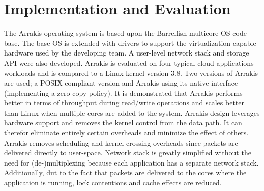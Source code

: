 \documentclass[letterpaper,twocolumn,10pt]{article}
\begin{document}
\section{Implementation and Evaluation}
The Arrakis operating system is based upon the Barrelfish multicore OS code base. The base OS is extended with drivers to support the virtualization capable hardware used by the developing team. A user-level network stack and storage API were also developed.
Arrakis is evaluated on four typical cloud applications workloads and is compared to a Linux kernel version 3.8. Two versions of Arrakis are used; a POSIX compliant version and Arrakis using its native interface (implementing a zero-copy policy).
It is demonstrated that Arrakis performs better in terms of throughput during read/write operations and scales better than Linux when multiple cores are added to the system.
Arrakis design leverages hardware support and removes the kernel control from the data path. It can therefor eliminate entirely certain overheads and minimize the effect of others. Arrakis removes scheduling and kernel crossing overheads since packets are delivered directly to user-space. Network stack is greatly simplified without the need for (de-)multiplexing because each application has a separate network stack. Additionally, dut to the fact that packets are delivered to the cores where the application is running, lock contentions and cache effects are reduced.

{\footnotesize 
}


\theendnotes
\end{document}
